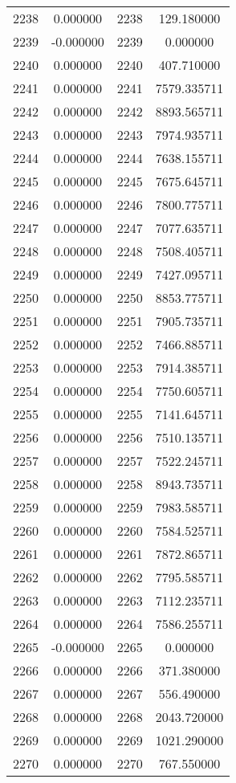 \documentclass[12pt]{article}
\begin{document}
\begin{longtable}{@{}cccc@{}}
2238 & 0.000000 & 2238 & 129.180000 \\
2239 & -0.000000 & 2239 & 0.000000 \\
2240 & 0.000000 & 2240 & 407.710000 \\
2241 & 0.000000 & 2241 & 7579.335711 \\
2242 & 0.000000 & 2242 & 8893.565711 \\
2243 & 0.000000 & 2243 & 7974.935711 \\
2244 & 0.000000 & 2244 & 7638.155711 \\
2245 & 0.000000 & 2245 & 7675.645711 \\
2246 & 0.000000 & 2246 & 7800.775711 \\
2247 & 0.000000 & 2247 & 7077.635711 \\
2248 & 0.000000 & 2248 & 7508.405711 \\
2249 & 0.000000 & 2249 & 7427.095711 \\
2250 & 0.000000 & 2250 & 8853.775711 \\
2251 & 0.000000 & 2251 & 7905.735711 \\
2252 & 0.000000 & 2252 & 7466.885711 \\
2253 & 0.000000 & 2253 & 7914.385711 \\
2254 & 0.000000 & 2254 & 7750.605711 \\
2255 & 0.000000 & 2255 & 7141.645711 \\
2256 & 0.000000 & 2256 & 7510.135711 \\
2257 & 0.000000 & 2257 & 7522.245711 \\
2258 & 0.000000 & 2258 & 8943.735711 \\
2259 & 0.000000 & 2259 & 7983.585711 \\
2260 & 0.000000 & 2260 & 7584.525711 \\
2261 & 0.000000 & 2261 & 7872.865711 \\
2262 & 0.000000 & 2262 & 7795.585711 \\
2263 & 0.000000 & 2263 & 7112.235711 \\
2264 & 0.000000 & 2264 & 7586.255711 \\
2265 & -0.000000 & 2265 & 0.000000 \\
2266 & 0.000000 & 2266 & 371.380000 \\
2267 & 0.000000 & 2267 & 556.490000 \\
2268 & 0.000000 & 2268 & 2043.720000 \\
2269 & 0.000000 & 2269 & 1021.290000 \\
2270 & 0.000000 & 2270 & 767.550000 \\

\end{longtable}
\end{document}

